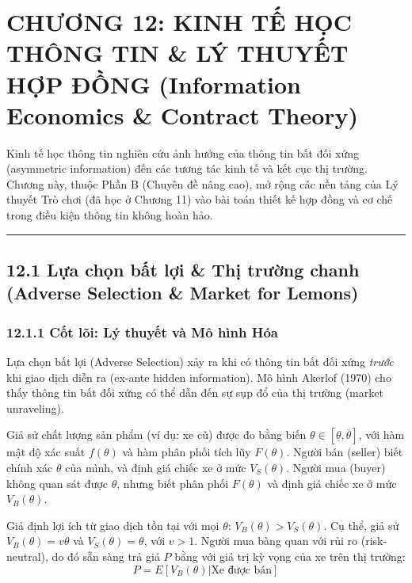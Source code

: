 \documentclass[
]{article}
\begin{document}
\section{CHƯƠNG 12: KINH TẾ HỌC THÔNG TIN \& LÝ THUYẾT HỢP ĐỒNG
(Information Economics \& Contract
Theory)}\label{chux1b0ux1a1ng-12-kinh-tux1ebf-hux1ecdc-thuxf4ng-tin-luxfd-thuyux1ebft-hux1ee3p-ux111ux1ed3ng-information-economics-contract-theory}

Kinh tế học thông tin nghiên cứu ảnh hưởng của thông tin bất đối xứng
(asymmetric information) đến các tương tác kinh tế và kết cục thị
trường. Chương này, thuộc Phần B (Chuyên đề nâng cao), mở rộng các nền
tảng của Lý thuyết Trò chơi (đã học ở Chương 11) vào bài toán thiết kế
hợp đồng và cơ chế trong điều kiện thông tin không hoàn hảo.

\begin{center}\rule{0.5\linewidth}{0.5pt}\end{center}

\subsection{12.1 Lựa chọn bất lợi \& Thị trường chanh (Adverse Selection
\& Market for
Lemons)}\label{lux1ef1a-chux1ecdn-bux1ea5t-lux1ee3i-thux1ecb-trux1b0ux1eddng-chanh-adverse-selection-market-for-lemons}

\subsubsection{12.1.1 Cốt lõi: Lý thuyết và Mô hình
Hóa}\label{cux1ed1t-luxf5i-luxfd-thuyux1ebft-vuxe0-muxf4-huxecnh-huxf3a}

Lựa chọn bất lợi (Adverse Selection) xảy ra khi có thông tin bất đối
xứng \emph{trước} khi giao dịch diễn ra (ex-ante hidden information). Mô
hình Akerlof (1970) cho thấy thông tin bất đối xứng có thể dẫn đến sự
sụp đổ của thị trường (market unraveling).

Giả sử chất lượng sản phẩm (ví dụ: xe cũ) được đo bằng biến
\(\theta \in [\underline{\theta}, \overline{\theta}]\), với hàm mật độ
xác suất \(f(\theta)\) và hàm phân phối tích lũy \(F(\theta)\). Người
bán (seller) biết chính xác \(\theta\) của mình, và định giá chiếc xe ở
mức \(V_S(\theta)\). Người mua (buyer) không quan sát được \(\theta\),
nhưng biết phân phối \(F(\theta)\) và định giá chiếc xe ở mức
\(V_B(\theta)\).

Giả định lợi ích từ giao dịch tồn tại với mọi \(\theta\):
\(V_B(\theta) > V_S(\theta)\). Cụ thể, giả sử \(V_B(\theta) = v \theta\)
và \(V_S(\theta) = \theta\), với \(v > 1\). Người mua bàng quan với rủi
ro (risk-neutral), do đó sẵn sàng trả giá \(P\) bằng với giá trị kỳ vọng
của xe trên thị trường: \[ P = E[V_B(\theta) | \text{Xe được bán}] \]
\end{document}

